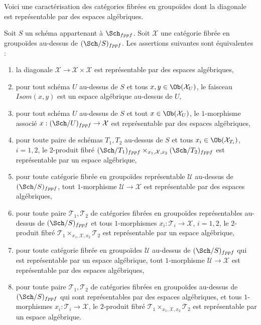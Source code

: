\noindent
Voici une caractérisation des catégories fibrées en groupoïdes
dont la diagonale est représentable par des espaces algébriques.

\begin{lemma}
\label{lemma-representable-diagonal}
Soit $S$ un schéma appartenant à $\Sch_{fppf}$.
Soit $\mathcal{X}$ une catégorie fibrée en groupoïdes au-dessus de
$(\Sch/S)_{fppf}$. Les assertions suivantes sont équivalentes :
\begin{enumerate}
\item la diagonale $\mathcal{X} \to \mathcal{X} \times \mathcal{X}$
est représentable par des espaces algébriques,
\item pour tout schéma $U$ au-dessus de $S$ et tous
$x, y \in \Ob(\mathcal{X}_U)$, le faisceau
$\mathit{Isom}(x, y)$ est un espace algébrique au-dessus de $U$,
\item pour tout schéma $U$ au-dessus de $S$ et tout $x \in \Ob(\mathcal{X}_U)$,
le $1$-morphisme associé $x : (\Sch/U)_{fppf} \to \mathcal{X}$
est représentable par des espaces algébriques,
\item pour toute paire de schémas $T_1, T_2$ au-dessus de $S$ et tous
$x_i \in \Ob(\mathcal{X}_{T_i})$, $i = 1, 2$, le $2$-produit fibré
$(\Sch/T_1)_{fppf} \times_{x_1, \mathcal{X}, x_2}
(\Sch/T_2)_{fppf}$
est représentable par un espace algébrique,
\item pour toute catégorie fibrée en groupoïdes représentable $\mathcal{U}$
au-dessus de $(\Sch/S)_{fppf}$, tout $1$-morphisme
$\mathcal{U} \to \mathcal{X}$ est représentable par des espaces algébriques,
\item pour toute paire $\mathcal{T}_1, \mathcal{T}_2$ de catégories fibrées
en groupoïdes représentables au-dessus de $(\Sch/S)_{fppf}$ et tous
$1$-morphismes $x_i : \mathcal{T}_i \to \mathcal{X}$, $i = 1, 2$, le
$2$-produit fibré $\mathcal{T}_1 \times_{x_1, \mathcal{X}, x_2} \mathcal{T}_2$
est représentable par un espace algébrique,
\item pour toute catégorie fibrée en groupoïdes $\mathcal{U}$
au-dessus de $(\Sch/S)_{fppf}$ qui est
représentable par un espace algébrique, tout $1$-morphisme
$\mathcal{U} \to \mathcal{X}$ est représentable par des espaces algébriques,
\item pour toute paire $\mathcal{T}_1, \mathcal{T}_2$ de catégories fibrées
en groupoïdes au-dessus de $(\Sch/S)_{fppf}$ qui sont représentables
par des espaces algébriques, et tous $1$-morphismes
$x_i : \mathcal{T}_i \to \mathcal{X}$, le
$2$-produit fibré $\mathcal{T}_1 \times_{x_1, \mathcal{X}, x_2} \mathcal{T}_2$
est représentable par un espace algébrique.
\end{enumerate}
\end{lemma}

